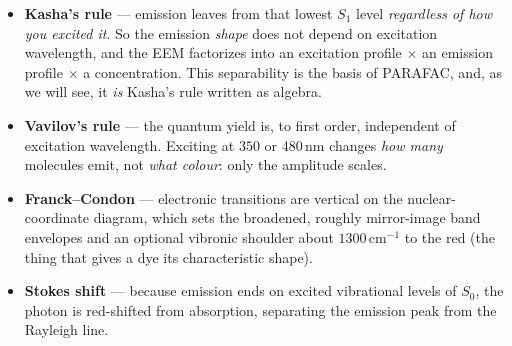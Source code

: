 \documentclass[11pt]{article}
\begin{document}
\begin{itemize}[leftmargin=1.4em,itemsep=0.15em]
\item \textbf{Kasha's rule} --- emission leaves from that lowest $S_1$ level \emph{regardless of how
you excited it}. So the emission \emph{shape} does not depend on excitation wavelength, and the EEM
factorizes into an excitation profile $\times$ an emission profile $\times$ a concentration. This
separability is the basis of PARAFAC, and, as we will see, it \emph{is} Kasha's rule written as
algebra.
\item \textbf{Vavilov's rule} --- the quantum yield is, to first order, independent of excitation
wavelength. Exciting at $350$ or $480\,$nm changes \emph{how many} molecules emit, not \emph{what
colour}: only the amplitude scales.
\item \textbf{Franck--Condon} --- electronic transitions are vertical on the nuclear-coordinate
diagram, which sets the broadened, roughly mirror-image band envelopes and an optional vibronic
shoulder about $1300\,\mathrm{cm}^{-1}$ to the red (the thing that gives a dye its characteristic
shape).
\item \textbf{Stokes shift} --- because emission ends on excited vibrational levels of $S_0$, the
photon is red-shifted from absorption, separating the emission peak from the Rayleigh line.
\end{itemize}
\end{document}
